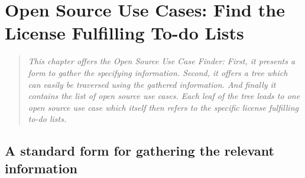 %
%
%
%
%



\chapter{Open Source Use Cases: Find the License Fulfilling To-do Lists}\label{sec:OSUCfinder}

\footnotesize
\begin{quote}\itshape
This chapter offers the \emph{Open Source Use Case Finder}: First, it presents a
form to gather the specifying information. Second, it offers a tree which can
easily be traversed using the gathered information. And finally it contains
the list of \emph{open source use cases}. Each leaf of the tree leads to one
\emph{open source use case} which itself then refers to the specific license
fulfilling to-do lists.
\end{quote}
\normalsize{}

\section{A standard form for gathering the relevant information}
\label{OSLiCStandardFormForGatheringInformation}
 
